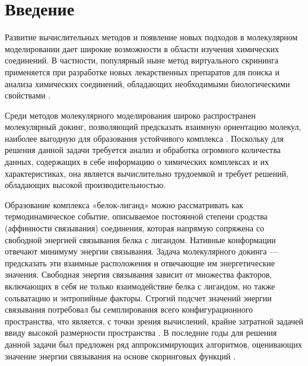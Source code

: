 \documentclass[preprint,12pt,3p]{elsarticle}
\begin{document}
\begin{frontmatter}

\end{frontmatter}


\section{Введение}

Развитие вычислительных методов и появление новых подходов в молекулярном моделировании дает широкие возможности в области изучения химических соединений. В частности, популярный ныне метод виртуального скрининга применяется при разработке новых лекарственных препаратов для поиска и анализа химических соединений, обладающих необходимыми биологическими свойствами \cite{virtual_screening}.

Среди методов молекулярного моделирования широко распространен молекулярный докинг, позволяющий предсказать взаимную ориентацию молекул, наиболее выгодную для образования устойчивого комплекса \cite{docking}. Поскольку для решения данной задачи требуется анализ и обработка огромного количества данных, содержащих в себе информацию о химических комплексах и их характеристиках, она является вычислительно трудоемкой и требует решений, обладающих высокой производительностью.

Образование комплекса «белок-лиганд» можно рассматривать как термодинамическое событие, описываемое постоянной степени сродства (аффинности связывания) соединения, которая напрямую сопряжена со свободной энергией связывания белка с лигандом. Нативные конформации отвечают минимуму энергии связывания. Задача молекулярного докинга — предсказать эти взаимные расположения и отвечающие им энергетические значения. Свободная энергия связывания зависит от множества факторов, включающих в себя не только взаимодействие белка с лигандом, но также сольватацию и энтропийные факторы. Строгий подсчет значений энергии связывания потребовал бы семплирования всего конфигурационного пространства, что является, с точки зрения вычислений, крайне затратной задачей ввиду высокой размерности пространства \cite{classification}. В последние годы для решения данной задачи был предложен ряд аппроксимирующих алгоритмов, оценивающих значение энергии связывания на основе скоринговых функций \cite{scoring_functions}.
\end{document}
